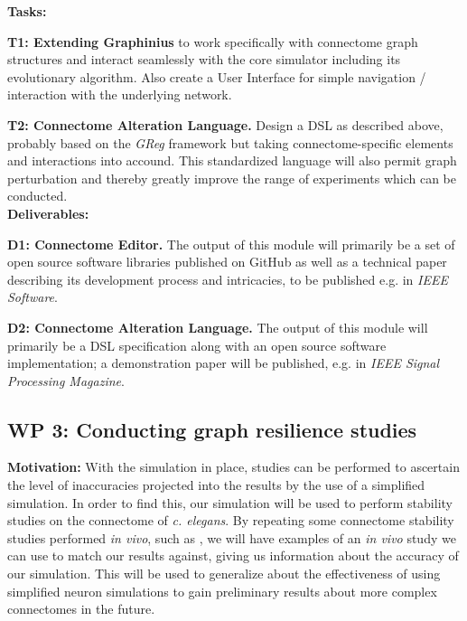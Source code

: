 \documentclass[a4paper,11pt]{article}
\begin{document}
\textbf{Tasks:}

\textbf{T1: Extending Graphinius} to work specifically with connectome graph structures and interact seamlessly with the core simulator including its evolutionary algorithm. Also create a User Interface for simple navigation / interaction with the underlying network.

\textbf{T2: Connectome Alteration Language.} Design a DSL as described above, probably based on the \emph{GReg} framework but taking connectome-specific elements and interactions into accound. This standardized language will also permit graph perturbation and thereby greatly improve the range of experiments which can be conducted.
\\[0,2cm]


\textbf{Deliverables:}

\textbf{D1: Connectome Editor.} The output of this module will primarily be a set of open source software libraries published on GitHub as well as a technical paper describing its development process and intricacies, to be published e.g. in \textit{IEEE Software}.

\textbf{D2: Connectome Alteration Language.} The output of this module will primarily be a DSL specification along with an open source software implementation; a demonstration paper will be published, e.g. in \textit{IEEE Signal Processing Magazine}.



\subsection{WP 3: Conducting graph resilience studies}

\citep{Ip2011ResilienceTransportationNetworks}
\citep{Gaudiot1990NetworkResilience}
\citep{Kirsch2006LessHashing}
\citep{Loguinov2005Peer2PeerResilience}
\citep{Peters2013BrainFunctionalNetworks}
\citep{Samatova2008GraphPerturbationScalableAlgorithms}
\citep{Ying2008RandomizingSocialNetworks}
\citep{Peters2013BrainFunctionalNetworks}
\citep{Hendrix2010}
\citep{Sauer2004}
\citep{Newman2003}
\citep{Piraveenan2012}
\citep{Ash2007}
\citep{betzel2013multi}


\textbf{Motivation:}
With the simulation in place, studies can be performed to ascertain the level of inaccuracies projected into the results by the use of a simplified simulation. In order to find this, our simulation will be used to perform stability studies on the connectome of \emph{c. elegans}. By repeating some connectome stability studies performed \emph{in vivo}, such as \citep{Avery1989473}, we will have examples of an \emph{in vivo} study we can use to match our results against, giving us information about the accuracy of our simulation. This will be used to generalize about the effectiveness of using simplified neuron simulations to gain preliminary results about more complex connectomes in the future. 
\end{document}
